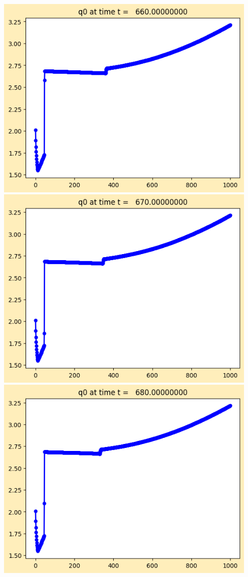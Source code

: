 \documentclass[11pt]{article}
\begin{document}
\vskip 10pt 
\includegraphics[width=0.95\textwidth]{frame0066fig1.png}
\vskip 10pt 
\includegraphics[width=0.95\textwidth]{frame0067fig1.png}
\vskip 10pt 
\includegraphics[width=0.95\textwidth]{frame0068fig1.png}
\end{document}
